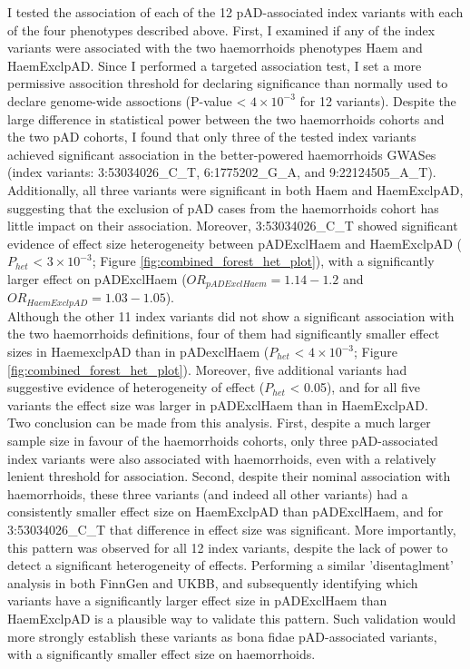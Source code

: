 I tested the association of each of the 12 pAD-associated index variants with each of the four phenotypes described above. First, I examined if any of the index variants were associated with the two haemorrhoids phenotypes Haem and HaemExclpAD. Since I performed a targeted association test, I set a more permissive assocition threshold for declaring significance than normally used to declare genome-wide assoctions (P-value < $4\times10^{-3}$ for 12 variants). Despite the large difference in statistical power between the two haemorrhoids cohorts and the two pAD cohorts, I found that only three of the tested index variants achieved significant association in the better-powered haemorrhoids GWASes (index variants: 3:53034026\_C\_T, 6:1775202\_G\_A, and 9:22124505\_A\_T). Additionally, all three variants were significant in both Haem and HaemExclpAD, suggesting that the exclusion of pAD cases from the haemorrhoids cohort has little impact on their association. Moreover, 3:53034026\_C\_T showed significant evidence of effect size heterogeneity between pADExclHaem and HaemExclpAD ($P_{het}$ < $3\times10^{-3}$; Figure \ref{fig:combined_forest_het_plot}), with a significantly larger effect on pADExclHaem ($OR_{pADExclHaem}=1.14-1.2$ and $OR_{HaemExclpAD}=1.03-1.05$).\\

Although the other 11 index variants did not show a significant association with the two haemorrhoids definitions, four of them had significantly smaller effect sizes in HaemexclpAD than in pADexclHaem ($P_{het}$ < $4\times10^{-3}$; Figure \ref{fig:combined_forest_het_plot}). Moreover, five additional variants had suggestive evidence of heterogeneity of effect ($P_{het}$ < 0.05), and for all five variants the effect size was larger in pADExclHaem than in HaemExclpAD. \\

Two conclusion can be made from this analysis. First, despite a much larger sample size in favour of the haemorrhoids cohorts, only three pAD-associated index variants were also associated with haemorrhoids, even with a relatively lenient threshold for association. Second, despite their nominal association with haemorrhoids, these three variants (and indeed all other variants) had a consistently smaller effect size on HaemExclpAD than pADExclHaem, and for 3:53034026\_C\_T that difference in effect size was significant. More importantly, this pattern was observed for all 12 index variants, despite the lack of power to detect a significant heterogeneity of effects. Performing a similar 'disentaglment' analysis in both FinnGen and UKBB, and subsequently identifying which variants have a significantly larger effect size in pADExclHaem than HaemExclpAD is a plausible way to validate this pattern. Such validation would more strongly establish these variants as bona fidae pAD-associated variants, with a significantly smaller effect size on haemorrhoids.\\

